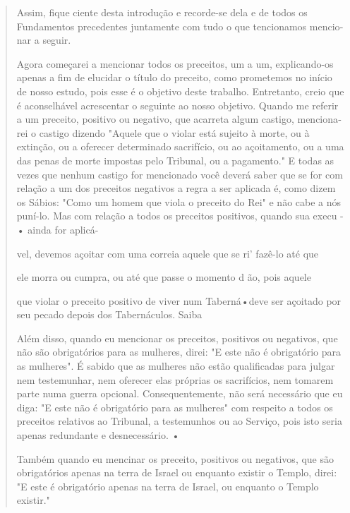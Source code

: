 \begin{quote}
Assim, fique ciente desta introdução e recorde-se dela e de todos os
Fundamentos precedentes juntamente com tudo o que tencionamos mencio­nar
a seguir.

Agora começarei a mencionar todos os preceitos, um a um, expli­cando-os
apenas a fim de elucidar o título do preceito, como prometemos no início
de nosso estudo, pois esse é o objetivo deste trabalho. Entretanto,
creio que é aconselhável acrescentar o seguinte ao nosso objetivo.
Quando me refe­rir a um preceito, positivo ou negativo, que acarreta
algum castigo, menciona­rei o castigo dizendo "Aquele que o violar está
sujeito à morte, ou à extinção, ou a oferecer determinado sacrifício, ou
ao açoitamento, ou a uma das penas de morte impostas pelo Tribunal, ou a
pagamento." E todas as vezes que ne­nhum castigo for mencionado você
deverá saber que se for com relação a um dos preceitos negativos a regra
a ser aplicada é, como dizem os Sábios: "Como um homem que viola o
preceito do Rei" e não cabe a nós puní-lo. Mas com relação a todos os
preceitos positivos, quando sua execu - • ainda for aplicá-

vel, devemos açoitar com uma correia aquele que se ri' fazê-lo até que

ele morra ou cumpra, ou até que passe o momento d ão, pois aquele

que violar o preceito positivo de viver num Taberná•deve ser açoi­tado
por seu pecado depois dos Tabernáculos. Saiba

Além disso, quando eu mencionar os preceitos, positivos ou negati­vos,
que não são obrigatórios para as mulheres, direi: "E este não é
obrigatório para as mulheres". É sabido que as mulheres não estão
qualificadas para julgar nem testemunhar, nem oferecer elas próprias os
sacrifícios, nem tomarem par­te numa guerra opcional. Consequentemente,
não será necessário que eu diga: "E este não é obrigatório para as
mulheres" com respeito a todos os preceitos relativos ao Tribunal, a
testemunhos ou ao Serviço, pois isto seria apenas re­dundante e
desnecessário. •

Também quando eu mencinar os preceito, positivos ou negativos, que são
obrigatórios apenas na terra de Israel ou enquanto existir o Templo,
direi: "E este é obrigatório apenas na terra de Israel, ou enquanto o
Templo existir."


\end{quote}
